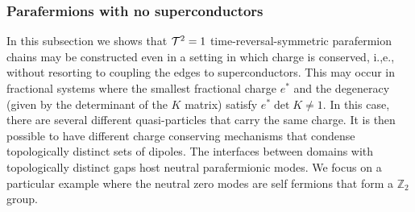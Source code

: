 \documentclass[twocolumn,aps,prb,showpacs]{revtex4-1}
\begin{document}
\subsubsection{Parafermions with no  superconductors}\label{331}
In this subsection we shows that ${\cal T}^2=1$ time-reversal-symmetric parafermion chains may be constructed even in a setting in which charge is conserved, i.,e., without resorting to coupling the edges to superconductors. This  may occur in fractional systems where the smallest fractional charge $ e^*$  and the degeneracy  (given by the determinant of the $K$ matrix) satisfy $e^*\det K \neq 1 $. In this case, there are several different quasi-particles that carry the same charge. It is then possible to have different charge conserving  mechanisms that condense topologically distinct sets of dipoles. The interfaces between domains with  topologically distinct gaps host neutral parafermionic modes.  We focus on a particular  example where the neutral zero modes are self fermions that  form a $\mathbb{Z}_2$ group.
\end{document}
